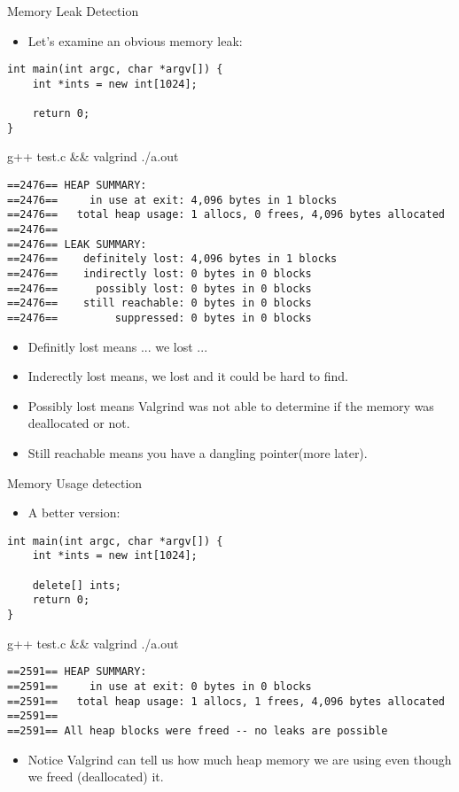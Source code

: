 \documentclass{beamer}
\begin{document}
\begin{frame}[fragile]{Memory Leak Detection}
\begin{itemize}
\item Let's examine an obvious memory leak:
\end{itemize}
\begin{lstlisting}
int main(int argc, char *argv[]) {
    int *ints = new int[1024];

    return 0;
}
\end{lstlisting}
g++ test.c \&\& valgrind ./a.out
\begin{lstlisting}
==2476== HEAP SUMMARY:
==2476==     in use at exit: 4,096 bytes in 1 blocks
==2476==   total heap usage: 1 allocs, 0 frees, 4,096 bytes allocated
==2476== 
==2476== LEAK SUMMARY:
==2476==    definitely lost: 4,096 bytes in 1 blocks
==2476==    indirectly lost: 0 bytes in 0 blocks
==2476==      possibly lost: 0 bytes in 0 blocks
==2476==    still reachable: 0 bytes in 0 blocks
==2476==         suppressed: 0 bytes in 0 blocks
\end{lstlisting}
\begin{itemize}
\item Definitly lost means ... we lost ...
\item Inderectly lost means, we lost and it could be hard to find.
\item Possibly lost means Valgrind was not able to determine if the memory was deallocated or not.
\item Still reachable means you have a dangling pointer(more later).
\end{itemize}
\end{frame}

\begin{frame}[fragile]{Memory Usage detection}
\begin{itemize}
\item A better version:
\end{itemize}
\begin{lstlisting}
int main(int argc, char *argv[]) {
    int *ints = new int[1024];

    delete[] ints;
    return 0;
}
\end{lstlisting}
g++ test.c \&\& valgrind ./a.out
\begin{lstlisting}
==2591== HEAP SUMMARY:
==2591==     in use at exit: 0 bytes in 0 blocks
==2591==   total heap usage: 1 allocs, 1 frees, 4,096 bytes allocated
==2591== 
==2591== All heap blocks were freed -- no leaks are possible
\end{lstlisting}
\begin{itemize}
\item Notice Valgrind can tell us how much heap memory we are using even though we freed (deallocated) it.
\end{itemize}
\end{frame}
\end{document}
